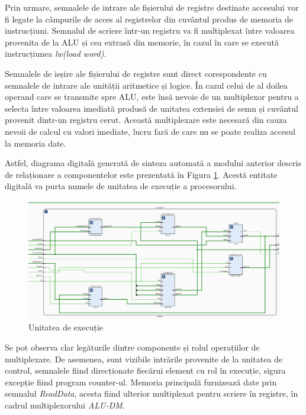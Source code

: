 \documentclass[12pt]{article}
\begin{document}
Prin urmare, semnalele de intrare ale fișierului de registre destinate accesului vor fi legate la câmpurile de acces al registrelor din cuvântul produs de memoria de instrucțiuni. Semnalul de scriere într-un registru va fi multiplexat între valoarea provenita de la ALU și cea extrasă din memorie, în cazul în care se execută instrucțiunea \textit{lw(load word)}.

 Semnalele de ieșire ale fișierului de registre sunt direct corespondente cu semnalele de intrare ale unității aritmetice și logice. În cazul celui de al doilea operand care se transmite spre ALU,  este însă nevoie de un multiplexor pentru a selecta între valoarea imediată produsă de unitatea extensiei de semn și cuvântul provenit dintr-un registru cerut. Această multiplexare este necesară din cauza nevoii de calcul cu valori imediate, lucru fară de care nu se poate realiza accesul la memoria date.
 
Astfel, diagrama digitală generată de sinteza automată a modului anterior descris de relaționare a componentelor este prezentată în Figura \ref{Figura:51}. Acestă entitate digitală va purta numele de unitatea de execuție a procesorului.

 \begin{figure}[h!]
 \includegraphics[width=1.0\textwidth]{execunit.png}
 \centering
 \caption{Unitatea de execuție}
 \label{Figura:51}
 \end{figure}
 
Se pot observa clar legăturile dintre componente și rolul operațiilor de multiplexare. De asemenea, sunt vizibile intrările provenite de la unitatea de control, semnalele fiind direcționate fiecărui element cu rol în execuție, sigura excepție fiind program counter-ul. Memoria principală furnizează date prin semnalul  \textit{ReadData}, acesta fiind ulterior multiplexat pentru scriere în registre, în cadrul multiplexorului  \textit{ALU-DM}.
\end{document}
